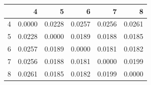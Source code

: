 \begin{tabular}{lrrrrr}
\toprule
 & 4 & 5 & 6 & 7 & 8 \\
\midrule
4 & 0.0000 & 0.0228 & 0.0257 & 0.0256 & 0.0261 \\
5 & 0.0228 & 0.0000 & 0.0189 & 0.0188 & 0.0185 \\
6 & 0.0257 & 0.0189 & 0.0000 & 0.0181 & 0.0182 \\
7 & 0.0256 & 0.0188 & 0.0181 & 0.0000 & 0.0199 \\
8 & 0.0261 & 0.0185 & 0.0182 & 0.0199 & 0.0000 \\
\bottomrule
\end{tabular}
